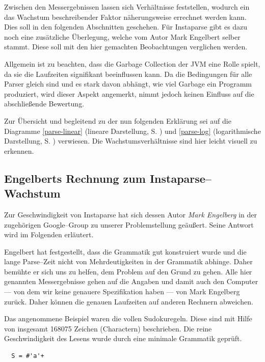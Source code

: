 \documentclass[ngerman,a4paper,abstracton,open=right,twoside=false,toc=listofnumbered,bibtotocnumbered]{scrreprt}
\begin{document}
Zwischen den Messergebnissen lassen sich Verhältnisse feststellen, wodurch ein das Wachstum beschreibender Faktor näherungsweise errechnet werden kann. Dies soll in den folgenden Abschnitten geschehen. Für Instaparse gibt es dazu noch eine zusätzliche Überlegung, welche vom Autor Mark Engelbert selber stammt. Diese soll mit den hier gemachten Beobachtungen verglichen werden.

Allgemein ist zu beachten, dass die Garbage Collection der JVM eine Rolle spielt, da sie die Laufzeiten signifikant beeinflussen kann. Da die Bedingungen für alle Parser gleich sind und es stark davon abhängt, wie viel \glqq{}Garbage\grqq{} ein Programm produziert, wird dieser Aspekt angemerkt, nimmt jedoch keinen Einfluss auf die abschließende Bewertung.

Zur Übersicht und begleitend zu der nun folgenden Erklärung sei auf die Diagramme \ref{parse-linear} (lineare Darstellung, S. \pageref{parse-linear}) und \ref{parse-log} (logarithmische Darstellung, S. \pageref{parse-log}) verwiesen. Die Wachstumsverhältnisse sind hier leicht visuell zu erkennen.

\subsection{Engelberts Rechnung zum Instaparse--Wachstum}\label{Engelberg}

Zur Geschwindigkeit von Instaparse hat sich dessen Autor \emph{Mark Engelberg} in der zugehörigen Google--Group zu unserer Problemstellung geäußert. Seine Antwort wird im Folgenden erläutert. \cite{instaparse-google-group}

Engelbert hat festgestellt, dass die Grammatik gut konstruiert wurde und die lange Parse--Zeit nicht von Mehrdeutigkeiten in der Grammatik abhinge. Daher bemühte er sich uns zu helfen, dem Problem auf den Grund zu gehen. Alle hier genannten Messergebnisse gehen auf die Angaben und damit auch den Computer --- von dem wir keine genauere Spezifikation haben --- von Mark Engelberg zurück. Daher können die genauen Laufzeiten auf anderen Rechnern abweichen.

Das angenommene Beispiel waren die vollen Sudokuregeln. Diese sind mit Hilfe von insgesamt 168075 Zeichen (Charactern) beschrieben. Die reine Geschwindigkeit des Lesens wurde durch eine minimale Grammatik geprüft.

\begin{lstlisting}
  S = #'a'+
\end{lstlisting}
\end{document}
